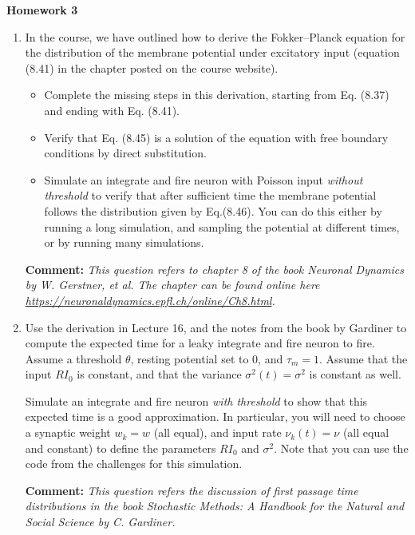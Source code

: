 \documentclass[12pt]{article}
\begin{document}

\begin{center}
{\Large \bf Homework 3
\\ \vskip5mm  }
\end{center}

\vskip5mm 


\begin{enumerate}
\item In the course, we  have outlined how to derive the Fokker--Planck equation for the distribution of the membrane potential under 
excitatory input (equation (8.41) in the chapter posted on the course website). 
\begin{itemize}
\item Complete the missing steps in this derivation, starting from Eq. (8.37) and ending with Eq. (8.41).  
\item Verify that Eq. (8.45) is a solution of the equation with free boundary conditions by direct substitution.
\item Simulate an integrate and fire neuron with Poisson input \emph{without threshold} to verify that after sufficient time
the membrane potential follows the distribution given by Eq.(8.46).  You can do this either by running a long simulation, and 
sampling the potential at different times, or by running many simulations.
\end{itemize}

{\bf Comment:} \emph{This question refers to chapter 8 of the book \emph{Neuronal Dynamics} by W. Gerstner, et al. 
The chapter can be found online here \url{https://neuronaldynamics.epfl.ch/online/Ch8.html}.}

\item Use the derivation in Lecture 16, and the notes from the book by Gardiner to compute the expected time for a
leaky integrate and fire neuron to fire. Assume a threshold $\theta$, resting potential set to 0, and $\tau_m = 1$.
Assume that the input $RI_0$ is constant, and that the variance $\sigma^2(t) = \sigma^2$ is constant as well.  

Simulate an integrate and fire neuron \emph{with threshold} to show that this expected time is a good approximation.
In particular, you will need to choose a synaptic weight $w_k = w$ (all equal), and input rate $\nu_k(t) = \nu$ (all equal and constant)
 to define the parameters $RI_0$ and $\sigma^2$.
Note that you can use the code from the challenges for this simulation. 

{\bf Comment:} \emph{This question refers the discussion of first passage time distributions in the book \emph{Stochastic Methods: A Handbook for the Natural and Social Science}
by C. Gardiner.}



\end{enumerate}
\end{document}

